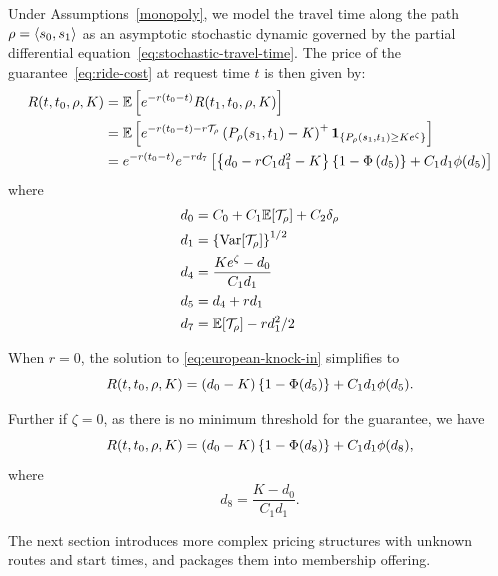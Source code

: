 \documentclass[12pt]{article}
\begin{document}
{{{{{{{Under Assumptions~\ref{monopoly}, we model the travel time along the path $\rho = {\langle {s_0},{ s_1}\rangle }$ as an asymptotic stochastic dynamic governed by the partial differential equation~\eqref{eq:stochastic-travel-time}. The price of the guarantee~\eqref{eq:ride-cost} at request time $t$ is then given by:
\begin{equation}\label{eq:european-knock-in}
\begin{aligned}
 R(t,t_0, \rho, K) &= \mathbb{E}\left[e^{-r(t_0-t)}R(t_1,t_0, \rho, K)\right] \\
  &= \mathbb{E}\left[e^{-r(t_0-t) -r\mathcal{T}_\rho}\left(P_\rho({ s_1}, t_1) - K\right)^+ {\bm 1}_{\left\{P_\rho({ s_1}, t_1) \geq Ke^\zeta\right\}}\right]  \\
  &=e^{-r(t_0-t)} e^{-rd_7}\left[\left\{d_0 - rC_1d_1^2- K\right\}\left\{1-\Phi\left(d_5\right)\right\} + C_1d_1 \phi(d_5)\right] \\
    \end{aligned}
\end{equation}
where 
\begin{align*}
    d_0 & = C_0 + C_1\mathbb{E}[\mathcal{T}_\rho] + C_2\delta_\rho\\ 
    d_1 &= \left\{\operatorname{{\rm Var}}[\mathcal{T}_\rho]\right\}^{1/2} \\
    d_4 &= \frac{Ke^\zeta -d_0}{C_1d_1} \\
    d_5 &= d_4 + rd_1\\
    d_7 &= \mathbb{E}[\mathcal{T}_\rho] - rd_1^2/2
\end{align*}

When $r=0$, the solution to \eqref{eq:european-knock-in} simplifies to 
\[ R(t,t_0, \rho, K) = (d_0-K)\left\{1- \Phi(d_5)\right\} + C_1d_1\phi(d_5).\]

Further if $\zeta=0$, as there is no minimum threshold for the guarantee, we have 
\[ R(t,t_0, \rho, K) = (d_0-K)\left\{1- \Phi(d_8)\right\} + C_1d_1\phi(d_8),\]
where
\[d_8 = \frac{K - d_0}{C_1d_1}.\]

The next section introduces more complex pricing structures with unknown routes and start times, and packages them into membership offering. 

}}}}}}}
\end{document}
